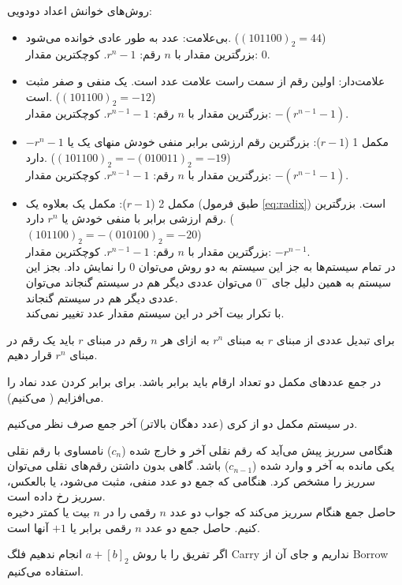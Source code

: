 \documentclass[a5paper]{article}
\begin{document}
روش‌های خوانش اعداد دودویی:
\begin{itemize}
  \item بی‌علامت: عدد به طور عادی خوانده می‌شود.
    ($(101100)_{2} = 44$)\\
    بزرگترین مقدار با $n$ رقم: $r^{n}-1$. کوچکترین مقدار: $0$.
  \item علامت‌دار: اولین رقم از سمت راست علامت عدد است. یک منفی و صفر مثبت است.
    ($(101100)_{2} = -12$)\\
    بزرگترین مقدار با $n$ رقم: $r^{n-1}-1$. کوچکترین مقدار: $-(r^{n-1}-1)$.
  \item مکمل 1 ($r-1$)‌: بزرگترین رقم ارزشی برابر منفی خودش منهای یک یا $-r^{n}-1$ دارد.
    ($(101100)_{2} = -(010011)_{2} = -19$)\\
    بزرگترین مقدار با $n$ رقم: $r^{n-1}-1$. کوچکترین مقدار: $-(r^{n-1}-1)$.
  \item مکمل 2 ($r-1$)‌: مکمل یک بعلاوه یک (طبق فرمول \ref{eq:radix}) است. بزرگترین رقم ارزشی برابر با منفی خودش یا $r^{n}$ دارد.
    ($(101100)_{2} = -(010100)_{2} = -20$)\\
    بزرگترین مقدار با $n$ رقم: $r^{n-1}-1$. کوچکترین مقدار: $-r^{n-1}$.\\
    در تمام سیستم‌ها به جز این سیستم به دو روش می‌توان $0$ را نمایش داد. بجز این سیستم به همین دلیل جای $0^{-}$ می‌توان عددی دیگر هم در سیستم گنجاند می‌توان عددی دیگر هم در سیستم گنجاند.\\
    با تکرار بیت آخر در این سیستم مقدار عدد تغییر نمی‌کند.
\end{itemize}


برای تبدیل عددی از مبنای $r$ به مبنای $r^{n}$ به ازای هر $n$ رقم در مبنای $r$ باید یک رقم در مبنای $r^{n}$ قرار دهیم.

در جمع عدد‌های مکمل دو تعداد ارقام باید برابر باشد. برای برابر کردن عدد نماد را می‌افزایم ( می‌کنیم).

در سیستم مکمل دو از کری (عدد دهگان بالاتر) آخر جمع صرف نظر می‌کنیم.

هنگامی سرریز پیش می‌آید که رقم نقلی آخر و خارج شده ($c_{n}$) نامساوی با رقم نقلی یکی مانده به آخر و وارد شده ($c_{n-1}$) باشد. گاهی بدون داشتن رقم‌های نقلی می‌توان سرریز را مشخص کرد. هنگامی که جمع دو عدد منفی، مثبت می‌شود، یا بالعکس، سرریز رخ داده است.\\
حاصل جمع هنگام سرریز می‌کند که جواب دو عدد $n$ رقمی را در $n$ بیت یا کمتر دخیره کنیم.
حاصل جمع دو عدد $n$ رقمی برابر یا $+1$ آنها است.

اگر تفریق را با روش $a + [b]_{2}$ انجام ندهیم فلگ Carry نداریم و جای آن از Borrow استفاده می‌کنیم.
\end{document}

